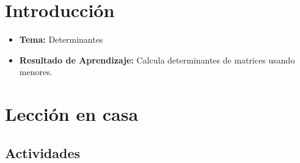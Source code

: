 \documentclass[a4,11pt]{aleph-notas}
\begin{document}
\encabezado

\vspace*{-10mm}
\section*{Introducción}

\begin{itemize}
    \item \textbf{Tema:} Determinantes
    \item \textbf{Resultado de Aprendizaje:} Calcula determinantes de matrices usando menores.
\end{itemize}

\section*{Lección en casa}

\subsection*{Actividades}
\end{document}
